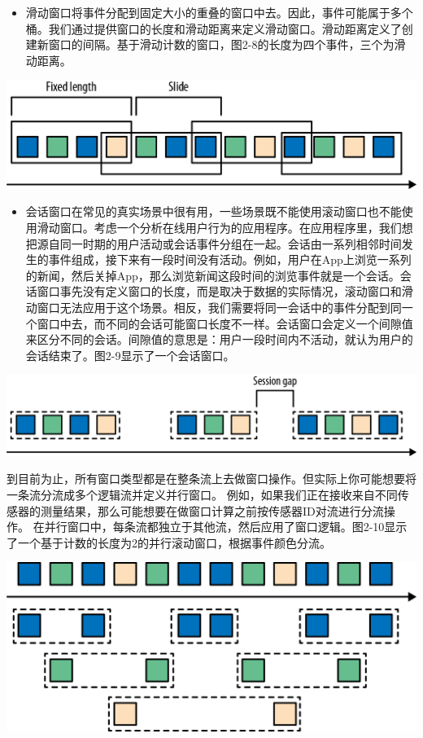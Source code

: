 \documentclass[cn,11pt,chinese]{elegantbook}
\providecommand{\tightlist}{%
  \setlength{\itemsep}{0pt}\setlength{\parskip}{0pt}}
\begin{document}
\begin{itemize}
\tightlist
\item
  滑动窗口将事件分配到固定大小的重叠的窗口中去。因此，事件可能属于多个桶。我们通过提供窗口的长度和滑动距离来定义滑动窗口。滑动距离定义了创建新窗口的间隔。基于滑动计数的窗口，图2-8的长度为四个事件，三个为滑动距离。
\end{itemize}

\includegraphics{images/spaf_0208.png}

\begin{itemize}
\tightlist
\item
  会话窗口在常见的真实场景中很有用，一些场景既不能使用滚动窗口也不能使用滑动窗口。考虑一个分析在线用户行为的应用程序。在应用程序里，我们想把源自同一时期的用户活动或会话事件分组在一起。会话由一系列相邻时间发生的事件组成，接下来有一段时间没有活动。例如，用户在App上浏览一系列的新闻，然后关掉App，那么浏览新闻这段时间的浏览事件就是一个会话。会话窗口事先没有定义窗口的长度，而是取决于数据的实际情况，滚动窗口和滑动窗口无法应用于这个场景。相反，我们需要将同一会话中的事件分配到同一个窗口中去，而不同的会话可能窗口长度不一样。会话窗口会定义一个间隙值来区分不同的会话。间隙值的意思是：用户一段时间内不活动，就认为用户的会话结束了。图2-9显示了一个会话窗口。
\end{itemize}

\includegraphics{images/spaf_0209.png}

到目前为止，所有窗口类型都是在整条流上去做窗口操作。但实际上你可能想要将一条流分流成多个逻辑流并定义并行窗口。
例如，如果我们正在接收来自不同传感器的测量结果，那么可能想要在做窗口计算之前按传感器ID对流进行分流操作。
在并行窗口中，每条流都独立于其他流，然后应用了窗口逻辑。图2-10显示了一个基于计数的长度为2的并行滚动窗口，根据事件颜色分流。

\includegraphics{images/spaf_0210.png}
\end{document}
